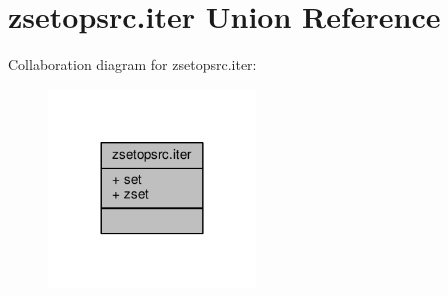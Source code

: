 \hypertarget{unionzsetopsrc_8iter}{}\section{zsetopsrc.\+iter Union Reference}
\label{unionzsetopsrc_8iter}


Collaboration diagram for zsetopsrc.\+iter\+:\nopagebreak
\begin{figure}[H]
\begin{center}
\leavevmode
\includegraphics[width=156pt]{unionzsetopsrc_8iter__coll__graph}
\end{center}
\end{figure}
